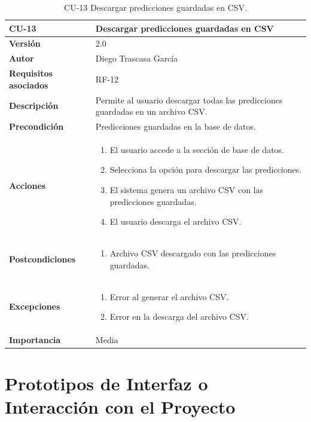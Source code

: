 \begin{table}[p]
	\centering
	\begin{tabularx}{\linewidth}{ p{} p{} }
		\toprule
		\textbf{CU-13}    & \textbf{Descargar predicciones guardadas en CSV}\\
		\toprule
		\textbf{Versión}              & 2.0    \\
		\textbf{Autor}                & Diego Trascasa García \\
		\textbf{Requisitos asociados} & RF-12 \\
		\textbf{Descripción}          & Permite al usuario descargar todas las predicciones guardadas en un archivo CSV. \\
		\textbf{Precondición}         & Predicciones guardadas en la base de datos. \\
		\textbf{Acciones}             &
		\begin{enumerate}
			\item El usuario accede a la sección de base de datos.
			\item Selecciona la opción para descargar las predicciones.
			\item El sistema genera un archivo CSV con las predicciones guardadas.
			\item El usuario descarga el archivo CSV.
		\end{enumerate}\\
		\textbf{Postcondiciones}      & 
		\begin{enumerate}
			\item Archivo CSV descargado con las predicciones guardadas.
		\end{enumerate}\\
		\textbf{Excepciones}          & 
		\begin{enumerate}
			\item Error al generar el archivo CSV.
			\item Error en la descarga del archivo CSV.
		\end{enumerate}\\
		\textbf{Importancia}          & Media \\
		\bottomrule
	\end{tabularx}
	\caption{CU-13 Descargar predicciones guardadas en CSV.}
    \label{CU-13}
\end{table}


\section{Prototipos de Interfaz o Interacción con el Proyecto}

